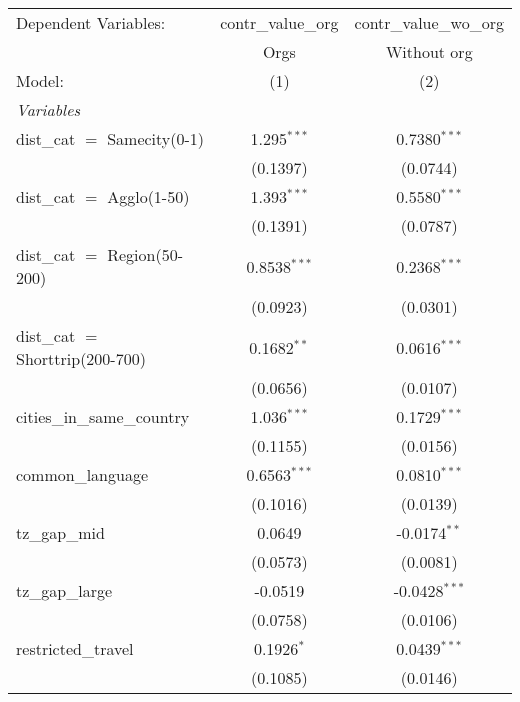 \begingroup
\centering
\begin{tabular}{lcc}
   \tabularnewline \midrule \midrule
   Dependent Variables:              & contr\_value\_org   & contr\_value\_wo\_org\\     
                                     & Orgs                & Without org \\   
   Model:                            & (1)                 & (2)\\  
   \midrule
   \emph{Variables}\\
   dist\_cat $=$ Samecity(0-1)       & 1.295$^{***}$       & 0.7380$^{***}$\\   
                                     & (0.1397)            & (0.0744)\\   
   dist\_cat $=$ Agglo(1-50)         & 1.393$^{***}$       & 0.5580$^{***}$\\   
                                     & (0.1391)            & (0.0787)\\   
   dist\_cat $=$ Region(50-200)      & 0.8538$^{***}$      & 0.2368$^{***}$\\   
                                     & (0.0923)            & (0.0301)\\   
   dist\_cat $=$ Shorttrip(200-700)  & 0.1682$^{**}$       & 0.0616$^{***}$\\   
                                     & (0.0656)            & (0.0107)\\   
   cities\_in\_same\_country         & 1.036$^{***}$       & 0.1729$^{***}$\\   
                                     & (0.1155)            & (0.0156)\\   
   common\_language                  & 0.6563$^{***}$      & 0.0810$^{***}$\\   
                                     & (0.1016)            & (0.0139)\\   
   tz\_gap\_mid                      & 0.0649              & -0.0174$^{**}$\\   
                                     & (0.0573)            & (0.0081)\\   
   tz\_gap\_large                    & -0.0519             & -0.0428$^{***}$\\   
                                     & (0.0758)            & (0.0106)\\   
   restricted\_travel                & 0.1926$^{*}$        & 0.0439$^{***}$\\   
                                     & (0.1085)            & (0.0146)\\   

\end{tabular}
